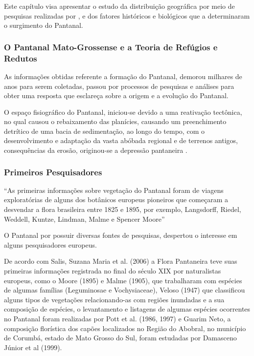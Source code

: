 		Este capítulo visa apresentar o estudo da distribuição geográfica por meio de pesquisas realizadas por ,  e dos fatores históricos e biológicos que a determinaram o surgimento do Pantanal.
		
		\subsubsection{O Pantanal Mato-Grossense e a Teoria de Refúgios e Redutos}
	
			As informações obtidas referente a formação do Pantanal, demorou milhares de anos para serem coletadas, passou por processos de pesquisas e análises para obter  uma resposta que esclareça sobre a origem e a evolução do Pantanal.
	
			O espaço fisiográfico do Pantanal, iniciou-se devido a uma reativação tectônica, no qual causou o rebaixamento das planícies, causando um preenchimento detrítico de uma bacia de sedimentação,  ao longo do tempo, com o desenvolvimento e adaptação da vasta abóbada regional e de terrenos antigos, consequências da erosão, originou-se a depressão pantaneira \cite{ab2006brasil}.
	        
	
		\subsubsection{Primeiros Pesquisadores}
	
			\begin{citacao}
				“As primeiras informações sobre vegetação do Pantanal foram de viagens exploratórias de alguns dos botânicos europeus pioneiros que começaram a desvendar a flora brasileira entre 1825 e 1895, por exemplo, Langsdorff, Riedel, Weddell, Kuntze, Lindman, Malme e Spencer Moore”\cite{pott2009vegetaccao}
			\end{citacao}
		
		
			O Pantanal por possuir diversas fontes de pesquisas, despertou o interesse em alguns pesquisadores europeus.
		
			De acordo com Salis, Suzana Maria et al. (2006) a Flora Pantaneira teve suas primeiras informações registrada no final do século XIX por naturalistas europeus, como o Moore (1895) e Malme (1905), que trabalharam com espécies de algumas famílias (Leguminosae e Vochysiaceae), Veloso (1947) que classificou alguns tipos de vegetações relacionando-as com regiões inundadas e a sua composição de espécies, o levantamento e listagens de algumas espécies ocorrentes no Pantanal foram realizadas por Pott et al. (1986, 1997) e Guarim Neto, a composição florística dos capões localizados no Região do Abobral, no município de Corumbá, estado de Mato Grosso do Sul, foram estudadas por Damasceno Júnior et al (1999).
		
